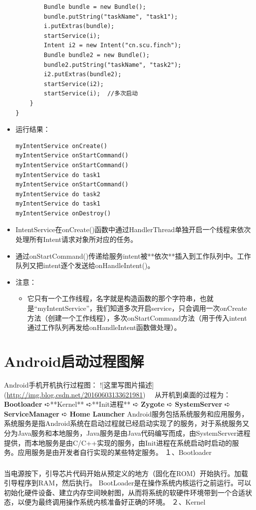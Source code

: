 \documentclass[9pt, b5paper]{article}
\begin{document}
\begin{itemize}
\begin{verbatim}
        Bundle bundle = new Bundle();  
        bundle.putString("taskName", "task1");  
        i.putExtras(bundle);  
        startService(i);  
        Intent i2 = new Intent("cn.scu.finch");  
        Bundle bundle2 = new Bundle();  
        bundle2.putString("taskName", "task2");  
        i2.putExtras(bundle2);  
        startService(i2); 
        startService(i);  //多次启动
    }
}
\end{verbatim}
\item 运行结果：
\begin{verbatim}
myIntentService onCreate()
myIntentService onStartCommand()
myIntentService onStartCommand()
myIntentService do task1
myIntentService onStartCommand()
myIntentService do task2
myIntentService do task1
myIntentService onDestroy()
\end{verbatim}
\item IntentService在onCreate()函数中通过HandlerThread单独开启一个线程来依次处理所有Intent请求对象所对应的任务。　
\item 通过onStartCommand()传递给服务intent被**依次**插入到工作队列中。工作队列又把intent逐个发送给onHandleIntent()。
\item 注意：
\begin{itemize}
\item 它只有一个工作线程，名字就是构造函数的那个字符串，也就是“myIntentService”，我们知道多次开启service，只会调用一次onCreate方法（创建一个工作线程），多次onStartCommand方法（用于传入intent通过工作队列再发给onHandleIntent函数做处理）。
\end{itemize}
\end{itemize}

\section{Android启动过程图解}
\label{sec-5}
Android手机开机执行过程图：
![这里写图片描述](\url{http://img.blog.csdn.net/20160603133621981})　
从开机到桌面的过程为：
\textbf{\textbf{Bootloader}} ➪**Kernel** ➪**Init进程** ➪ \textbf{\textbf{Zygote}} ➪ \textbf{\textbf{SystemServer}} ➪ \textbf{\textbf{ServiceManager}} ➪ \textbf{\textbf{Home Launcher}}
Android服务包括系统服务和应用服务，系统服务是指Android系统在启动过程就已经启动实现了的服务，对于系统服务又分为Java服务和本地服务，Java服务是由Java代码编写而成，由SystemServer进程提供，而本地服务是由C/C++实现的服务，由Init进程在系统启动时启动的服务。应用服务是由开发者自行实现的某些特定服务。
 １、Bootloader
\subsubsection{}
\label{sec-5-0-1}
当电源按下，引导芯片代码开始从预定义的地方（固化在ROM）开始执行。加载引导程序到RAM，然后执行。
BootLoader是在操作系统内核运行之前运行。可以初始化硬件设备、建立内存空间映射图，从而将系统的软硬件环境带到一个合适状态，以便为最终调用操作系统内核准备好正确的环境。
 ２、Kernel
\end{document}
